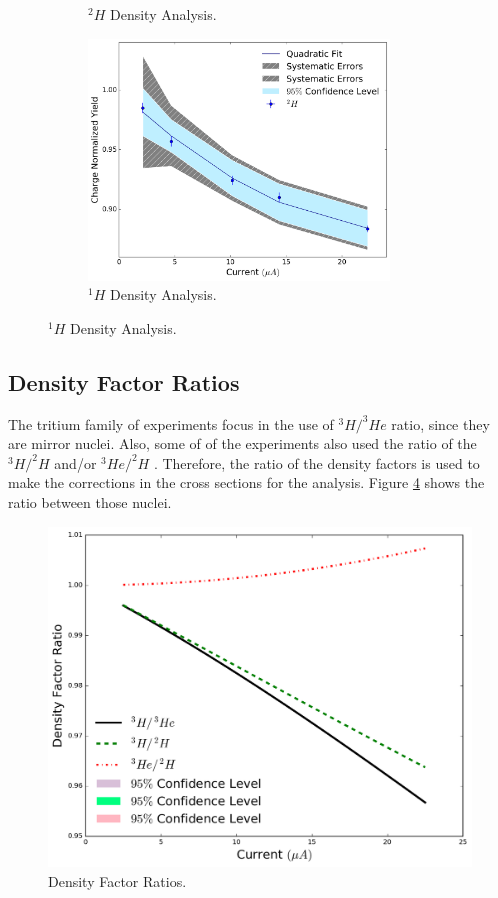 \documentclass[final,5p,times,twocolumn]{elsarticle}
\begin{document}
\begin{figure}[h]
\begin{center}
\begin{subfigure}{8cm}
    \caption{$^{2}H$ Density Analysis.}
    \label{fig:deuterium_data}
  \end{subfigure}
  \begin{subfigure}{8cm}
    \centering\includegraphics[width=8cm]{images/hydrogen_data.pdf}
    \caption{$^{1}H$ Density Analysis.}
    \label{fig:hydrogen_data}
  \end{subfigure}
  \end{center}
  \label{fig:tritium_targets}
\end{figure}




\subsection{Density Factor Ratios}

The tritium family of experiments focus in the use of $^{3}H/^{3}He$ ratio, since they are mirror nuclei.  Also, some of of the experiments also used the ratio of the $^{3}H/^{2}H $ and/or  $^{3}He/^{2}H $ . Therefore, the ratio of the density factors is used to make the corrections in the cross sections for the analysis. Figure \ref{fig:density_ratios} shows the ratio between those nuclei. 


\begin{figure}[!h]
 \centering
 \includegraphics[width=\linewidth]{images/density_factor_ratios.pdf}
  \caption{Density Factor Ratios. }
  \label{fig:density_ratios}
\end{figure}
\end{document}
